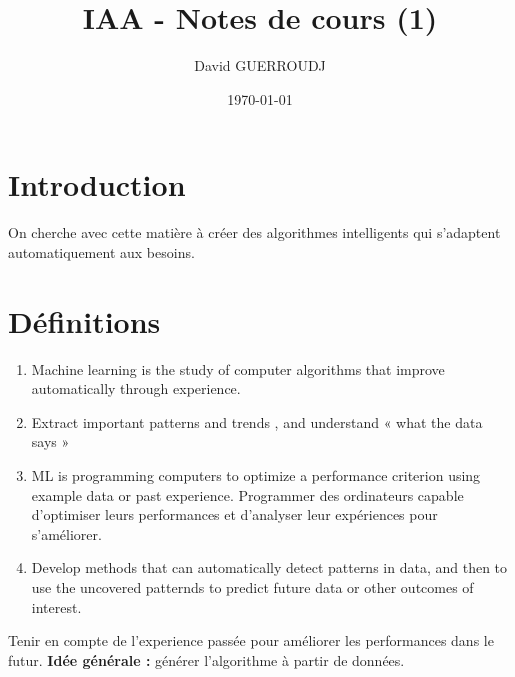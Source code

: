 \documentclass{article}
\title{IAA - Notes de cours (1)}
\author{David GUERROUDJ}
\date{\today}
\begin{document}
\maketitle %

\tableofcontents %
\vfill\eject
\section{Introduction}
On cherche avec cette matière à créer des algorithmes intelligents qui s'adaptent automatiquement aux besoins. 

\section{Définitions} 
\begin{enumerate}
\item Machine learning is the study of computer algorithms that improve automatically through experience.
\item Extract important patterns and trends , and understand « what the data says »
\item ML is programming computers to optimize a performance criterion using example data or past experience. Programmer des ordinateurs capable d'optimiser leurs performances et d'analyser leur expériences pour s'améliorer.
\item Develop methods that can automatically detect patterns in data, and then to use the uncovered patternds to predict future data or other outcomes of interest.
\end{enumerate}

Tenir en compte de l'experience passée pour améliorer les performances dans le futur.
\smallbreak \textbf{Idée générale :} générer l'algorithme à partir de données.
\end{document}
